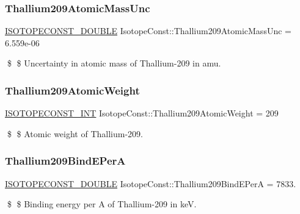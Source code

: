 \subsubsection{\texorpdfstring{Thallium209\+Atomic\+Mass\+Unc}{Thallium209AtomicMassUnc}}
{\footnotesize\ttfamily \mbox{\hyperlink{group___isotope_const-_macros_ga8f45a7272ce02c0b4c65c44636ed719a}{I\+S\+O\+T\+O\+P\+E\+C\+O\+N\+S\+T\+\_\+\+D\+O\+U\+B\+LE}} Isotope\+Const\+::\+Thallium209\+Atomic\+Mass\+Unc = 6.\+559e-\/06}

\$ \$ Uncertainty in atomic mass of Thallium-\/209 in amu. \mbox{\label{group___isotope_const-_thallium-_tl209_ga2ca3e2954bcfcb9f45484af01b056d82}} 
\subsubsection{\texorpdfstring{Thallium209\+Atomic\+Weight}{Thallium209AtomicWeight}}
{\footnotesize\ttfamily \mbox{\hyperlink{group___isotope_const-_macros_ga5f18360b3e99483a35c32d789e62621c}{I\+S\+O\+T\+O\+P\+E\+C\+O\+N\+S\+T\+\_\+\+I\+NT}} Isotope\+Const\+::\+Thallium209\+Atomic\+Weight = 209}

\$ \$ Atomic weight of Thallium-\/209. \mbox{\label{group___isotope_const-_thallium-_tl209_gaa8fc78769d65dd4ff380f3607ab6b036}} 
\subsubsection{\texorpdfstring{Thallium209\+Bind\+E\+PerA}{Thallium209BindEPerA}}
{\footnotesize\ttfamily \mbox{\hyperlink{group___isotope_const-_macros_ga8f45a7272ce02c0b4c65c44636ed719a}{I\+S\+O\+T\+O\+P\+E\+C\+O\+N\+S\+T\+\_\+\+D\+O\+U\+B\+LE}} Isotope\+Const\+::\+Thallium209\+Bind\+E\+PerA = 7833.}

\$ \$ Binding energy per A of Thallium-\/209 in keV. \mbox{\label{group___isotope_const-_thallium-_tl209_ga62ea01fef86244bb5ceebc7428c107ba}} 
